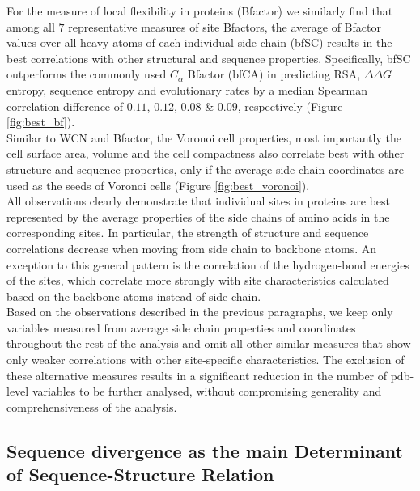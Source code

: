 \documentclass[11pt]{article}
\newcommand{\ddg}{$\Delta\Delta G~$}
\begin{document}
        For the measure of local flexibility in proteins (Bfactor) we similarly find that among all $7$ representative measures of site Bfactors, the average of Bfactor values over all heavy atoms of each individual side chain (bfSC) results in the best correlations with other structural and sequence properties. Specifically, bfSC outperforms the commonly used $C_\alpha$ Bfactor (bfCA) in predicting RSA, \ddg entropy, sequence entropy and evolutionary rates by a median Spearman correlation difference of $0.11$, $0.12$, $0.08$ \& $0.09$, respectively (Figure \ref{fig:best_bf}).
        \\

        Similar to WCN and Bfactor, the Voronoi cell properties, most importantly the cell surface area, volume and the cell compactness also correlate best with other structure and sequence properties, only if the average side chain coordinates are used as the seeds of Voronoi cells (Figure \ref{fig:best_voronoi}).
        \\

        All observations clearly demonstrate that individual sites in proteins are best represented by the average properties of the side chains of amino acids in the corresponding sites. In particular, the strength of structure and sequence correlations decrease when moving from side chain to backbone atoms. An exception to this general pattern is the correlation of the hydrogen-bond energies of the sites, which correlate more strongly with site characteristics calculated based on the backbone atoms instead of side chain.
        \\

        Based on the observations described in the previous paragraphs, we keep only variables measured from average side chain properties and coordinates throughout the rest of the analysis and omit all other similar measures that show only weaker correlations with other site-specific characteristics. The exclusion of these alternative measures results in a significant reduction in the number of pdb-level variables to be further analysed, without compromising generality and comprehensiveness of the analysis.
        \\


    \subsection*{Sequence divergence as the main Determinant of Sequence-Structure Relation}
\end{document}
